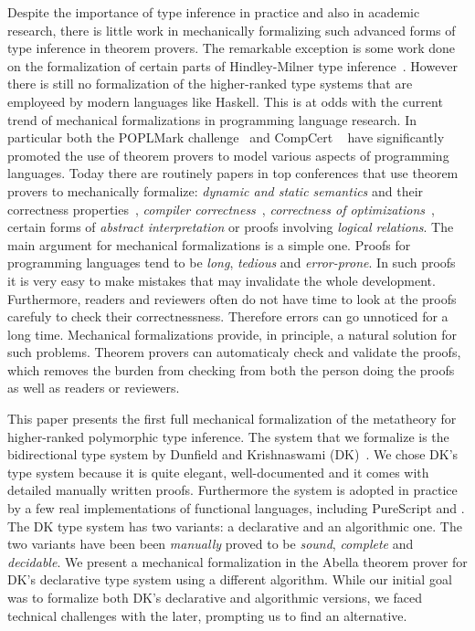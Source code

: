 Despite the importance of type inference in practice and also in
academic research, there is little work in mechanically formalizing
such advanced forms of type inference in theorem provers.
The remarkable exception is some work done on the formalization of 
certain parts of Hindley-Milner type inference~\cite{}. However
there is still no formalization of the higher-ranked type systems
that are employeed by modern languages like Haskell.
This is at
odds with the current trend of mechanical formalizations in
programming language research. In particular both the POPLMark
challenge~\cite{} and CompCert ~\cite{} have significantly promoted
the use of theorem provers to model various aspects of programming
languages. Today there are routinely papers in top conferences
that use theorem provers to mechanically formalize: \emph{dynamic and
  static semantics} and their correctness properties~\cite{},
\emph{compiler correctness}~\cite{}, \emph{correctness of
  optimizations}~\cite{}, certain forms of \emph{abstract
  interpretation} or proofs involving \emph{logical relations}. The
main argument for mechanical formalizations is a simple one. Proofs
for programming languages tend to be \emph{long}, \emph{tedious} and
\emph{error-prone}. In such proofs it is very easy to make mistakes
that may invalidate the whole development. Furthermore, readers and
reviewers often do not have time to look at the proofs carefuly to
check their correctnessness. Therefore errors can go unnoticed for a
long time.  Mechanical formalizations provide, in principle, a natural
solution for such problems. Theorem provers can automaticaly check and
validate the proofs, which removes the burden from checking from both
the person doing the proofs as well as readers or reviewers.

This paper presents the first full mechanical formalization of the
metatheory for higher-ranked polymorphic type inference.
The system
that we formalize is the bidirectional type system by Dunfield and
Krishnaswami (DK)~\cite{}. We chose DK's type system because it is
quite elegant, well-documented and it comes with detailed manually
written proofs. Furthermore the system is adopted in practice by a few
real implementations of functional languages, including PureScript and
.  The DK type system has two variants: a declarative
and an algorithmic one. The two variants have been been
\emph{manually} proved to be \emph{sound}, \emph{complete} and
\emph{decidable}.
We present a mechanical formalization in the Abella theorem prover for
DK's declarative type system using a different algorithm. While our
initial goal was to formalize both DK's declarative and algorithmic
versions, we faced technical challenges with the later, prompting us to find
an alternative.


